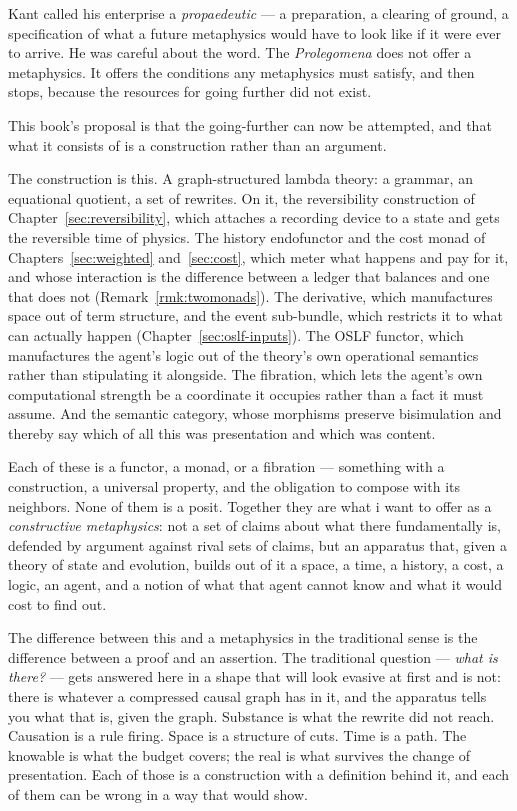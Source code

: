 Kant called his enterprise a \emph{propaedeutic} --- a
preparation, a clearing of ground, a specification of what a future
metaphysics would have to look like if it were ever to arrive.
He was careful about the word.
The \emph{Prolegomena} does not offer a metaphysics.
It offers the conditions any metaphysics must satisfy, and then
stops, because the resources for going further did not exist.

This book's proposal is that the going-further can now be
attempted, and that what it consists of is a construction rather
than an argument.

The construction is this.
A graph-structured lambda theory: a grammar, an equational
quotient, a set of rewrites.
On it, the reversibility construction of
Chapter~\ref{sec:reversibility}, which attaches a recording device
to a state and gets the reversible time of physics.
The history endofunctor and the cost monad of
Chapters~\ref{sec:weighted} and~\ref{sec:cost}, which meter what
happens and pay for it, and whose interaction is the difference
between a ledger that balances and one that
does not (Remark~\ref{rmk:twomonads}).
The derivative, which manufactures space out of term structure,
and the event sub-bundle, which restricts it to what can actually
happen (Chapter~\ref{sec:oslf-inputs}).
The OSLF functor, which manufactures the agent's logic out of the
theory's own operational semantics rather than stipulating it
alongside.
The fibration, which lets the agent's own computational strength be
a coordinate it occupies rather than a fact it must assume.
And the semantic category, whose morphisms preserve bisimulation
and thereby say which of all this was presentation and which was
content.

Each of these is a functor, a monad, or a fibration --- something
with a construction, a universal property, and the obligation to
compose with its neighbors.
None of them is a posit.
Together they are what i want to offer as a \emph{constructive
metaphysics}: not a set of claims about what there fundamentally
is, defended by argument against rival sets of claims, but an
apparatus that, given a theory of state and evolution, builds out
of it a space, a time, a history, a cost, a logic, an agent, and a
notion of what that agent cannot know and what it would cost to
find out.

The difference between this and a metaphysics in the traditional
sense is the difference between a proof and an assertion.
The traditional question --- \emph{what is there?} --- gets
answered here in a shape that will look evasive at first and is
not: there is whatever a compressed causal graph has in it, and the
apparatus tells you what that is, given the graph.
Substance is what the rewrite did not reach.
Causation is a rule firing.
Space is a structure of cuts.
Time is a path.
The knowable is what the budget covers; the real is what survives
the change of presentation.
Each of those is a construction with a definition behind it, and
each of them can be wrong in a way that would show.

